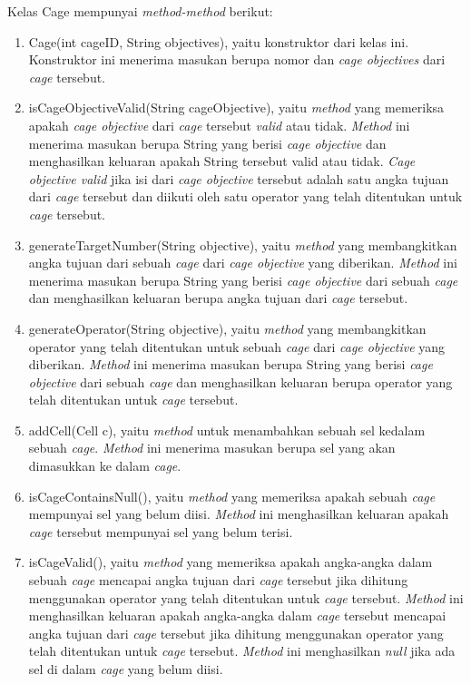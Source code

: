 Kelas Cage mempunyai \textit{method-method} berikut:

\begin{enumerate}
\item Cage(int cageID, String objectives), yaitu konstruktor dari kelas ini. Konstruktor ini menerima masukan berupa nomor dan \textit{cage objectives} dari \textit{cage} tersebut.
\item isCageObjectiveValid(String cageObjective), yaitu \textit{method} yang memeriksa apakah \textit{cage objective} dari \textit{cage} tersebut \textit{valid} atau tidak. \textit{Method} ini menerima masukan berupa String yang berisi \textit{cage objective} dan menghasilkan keluaran apakah String tersebut valid atau tidak. \textit{Cage objective valid} jika isi dari \textit{cage objective} tersebut adalah satu angka tujuan dari \textit{cage} tersebut dan diikuti oleh satu operator yang telah ditentukan untuk \textit{cage} tersebut.
\item generateTargetNumber(String objective), yaitu \textit{method} yang membangkitkan angka tujuan dari sebuah \textit{cage} dari \textit{cage objective} yang diberikan. \textit{Method} ini menerima masukan berupa String yang berisi \textit{cage objective} dari sebuah \textit{cage} dan menghasilkan keluaran berupa angka tujuan dari \textit{cage} tersebut.
\item generateOperator(String objective), yaitu \textit{method} yang membangkitkan operator yang telah ditentukan untuk sebuah \textit{cage} dari \textit{cage objective} yang diberikan. \textit{Method} ini menerima masukan berupa String yang berisi \textit{cage objective} dari sebuah \textit{cage} dan menghasilkan keluaran berupa operator yang telah ditentukan untuk \textit{cage} tersebut.
\item addCell(Cell c), yaitu \textit{method} untuk menambahkan sebuah sel kedalam sebuah \textit{cage}. \textit{Method} ini menerima masukan berupa sel yang akan dimasukkan ke dalam \textit{cage}.
\item isCageContainsNull(), yaitu \textit{method} yang memeriksa apakah sebuah \textit{cage} mempunyai sel yang belum diisi. \textit{Method} ini menghasilkan keluaran apakah \textit{cage} tersebut mempunyai sel yang belum terisi.
\item isCageValid(), yaitu \textit{method} yang memeriksa apakah angka-angka dalam sebuah \textit{cage} mencapai angka tujuan dari \textit{cage} tersebut jika dihitung menggunakan operator yang telah ditentukan untuk \textit{cage} tersebut. \textit{Method} ini menghasilkan keluaran apakah angka-angka dalam \textit{cage} tersebut mencapai angka tujuan dari \textit{cage} tersebut jika dihitung menggunakan operator yang telah ditentukan untuk \textit{cage} tersebut. \textit{Method} ini menghasilkan \textit{null} jika ada sel di dalam \textit{cage} yang belum diisi.

\end{enumerate}
